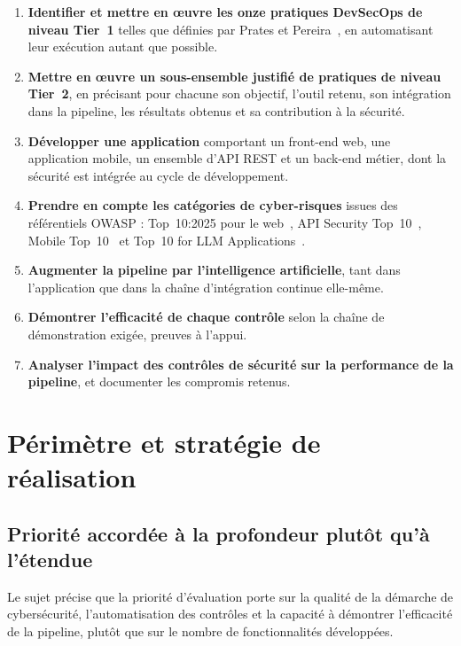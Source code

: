 \begin{enumerate}
  \item \textbf{Identifier et mettre en œuvre les onze pratiques DevSecOps de
  niveau Tier~1} telles que définies par Prates et Pereira~\cite{prates2025},
  en automatisant leur exécution autant que possible.

  \item \textbf{Mettre en œuvre un sous-ensemble justifié de pratiques de
  niveau Tier~2}, en précisant pour chacune son objectif, l'outil retenu, son
  intégration dans la pipeline, les résultats obtenus et sa contribution à la
  sécurité.

  \item \textbf{Développer une application} comportant un front-end web, une
  application mobile, un ensemble d'API REST et un back-end métier, dont la
  sécurité est intégrée au cycle de développement.

  \item \textbf{Prendre en compte les catégories de cyber-risques} issues des
  référentiels OWASP : Top~10:2025 pour le web~\cite{owasptop10}, API
  Security Top~10~\cite{owaspapi}, Mobile Top~10~\cite{owaspmobile} et
  Top~10 for LLM Applications~\cite{owaspllm}.

  \item \textbf{Augmenter la pipeline par l'intelligence artificielle}, tant
  dans l'application que dans la chaîne d'intégration continue elle-même.

  \item \textbf{Démontrer l'efficacité de chaque contrôle} selon la chaîne de
  démonstration exigée, preuves à l'appui.

  \item \textbf{Analyser l'impact des contrôles de sécurité sur la performance
  de la pipeline}, et documenter les compromis retenus.
\end{enumerate}

\section{Périmètre et stratégie de réalisation}

\subsection{Priorité accordée à la profondeur plutôt qu'à l'étendue}

Le sujet précise que la priorité d'évaluation porte sur la qualité de la
démarche de cybersécurité, l'automatisation des contrôles et la capacité à
démontrer l'efficacité de la pipeline, plutôt que sur le nombre de
fonctionnalités développées.

